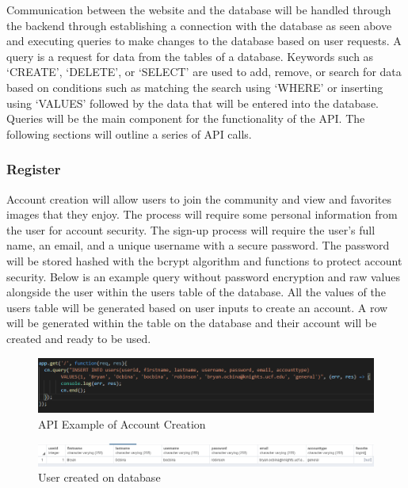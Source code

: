 \documentclass[12pt]{report}
\begin{document}
Communication between the website and the database will be handled through the backend through establishing a connection with the database as seen above and executing queries to make changes to the database based on user requests.  A query is a request for data from the tables of a database.  Keywords such as ‘CREATE’, ‘DELETE’, or ‘SELECT’ are used to add, remove, or search for data based on conditions such as matching the search using ‘WHERE’ or inserting using ‘VALUES’ followed by the data that will be entered into the database.  Queries will be the main component for the functionality of the API.  The following sections will outline a series of API calls.

\subsubsection*{Register}

Account creation will allow users to join the community and view and favorites images that they enjoy.  The process will require some personal information from the user for account security.  The sign-up process will require the user’s full name, an email, and a unique username with a secure password.  The password will be stored hashed with the bcrypt algorithm and functions to protect account security.  Below is an example query without password encryption and raw values alongside the user within the users table of the database.  All the values of the users table will be generated based on user inputs to create an account.  A row will be generated within the table on the database and their account will be created and ready to be used.

\begin{figure}[h]
	\centering
	\includegraphics[width=\linewidth]{api_raw_register}
	\caption{API Example of Account Creation}
	\label{fig:API Register}
\end{figure}

\begin{figure}[h]
	\centering
	\includegraphics[width=\linewidth]{database_user}
	\caption{User created on database}
	\label{fig:Database User}
\end{figure}
\end{document}
